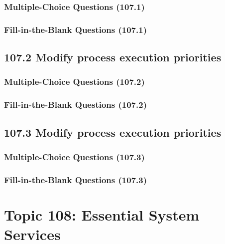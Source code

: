 \documentclass[a4paper]{report}
\begin{document}
\subsubsection*{Multiple-Choice Questions (107.1)}

\subsubsection*{Fill-in-the-Blank Questions (107.1)}

\subsection*{107.2 Modify process execution priorities}
\subsubsection*{Multiple-Choice Questions (107.2)}

\subsubsection*{Fill-in-the-Blank Questions (107.2)}

\subsection*{107.3 Modify process execution priorities}
\subsubsection*{Multiple-Choice Questions (107.3)}

\subsubsection*{Fill-in-the-Blank Questions (107.3)}


\section*{Topic 108: Essential System Services}
\end{document}
